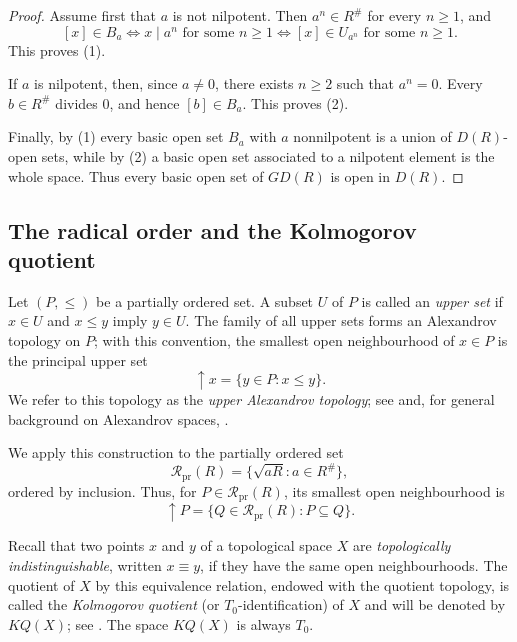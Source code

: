 \documentclass[11pt]{amsart}
\theoremstyle{plain}
\theoremstyle{definition}
\theoremstyle{remark}
\numberwithin{equation}{section}
\begin{document}
\begin{proof}
	Assume first that $a$ is not nilpotent. Then $a^n\in R^\#$ for every
	$n\geq1$, and
	\[
	[x]\in B_a
	\Longleftrightarrow
	x\mid a^n \text{ for some }n\geq1
	\Longleftrightarrow
	[x]\in U_{a^n}\text{ for some }n\geq1.
	\]
	This proves (1).
	
	If $a$ is nilpotent, then, since $a\neq 0$, there exists $n\geq 2$ such that $a^n=0$. Every
	$b\in R^\#$ divides $0$, and hence $[b]\in B_a$. This proves (2).
	
	Finally, by (1) every basic open set $B_a$ with $a$ nonnilpotent is a
	union of $D(R)$-open sets, while by (2) a basic open set associated to a
	nilpotent element is the whole space. Thus every basic open set of $GD(R)$
	is open in $D(R)$.
\end{proof}


\subsection{The radical order and the Kolmogorov quotient}

Let $(P,\leq)$ be a partially ordered set. A subset $U$ of $P$ is called
an \emph{upper set} if $x\in U$ and $x\leq y$ imply $y\in U$. The family
of all upper sets forms an Alexandrov topology on $P$; with this convention,
the smallest open neighbourhood of $x\in P$ is the principal upper set
\[
\uparrow x=\{y\in P:x\leq y\}.
\]
We refer to this topology as the \emph{upper Alexandrov topology};
see \cite{Curry} and, for general background on Alexandrov spaces,
\cite{Alex,Arenas}.

We apply this construction to the partially ordered set
\[
\mathcal R_{\mathrm{pr}}(R)
=
\{\sqrt{aR}:a\in R^\#\},
\]
ordered by inclusion. Thus, for $P\in\mathcal R_{\mathrm{pr}}(R)$, its
smallest open neighbourhood is
\[
\uparrow P
=
\{Q\in\mathcal R_{\mathrm{pr}}(R):P\subseteq Q\}.
\]

Recall that two points $x$ and $y$ of a topological space $X$ are
\emph{topologically indistinguishable}, written $x\equiv y$, if they have
the same open neighbourhoods. The quotient of $X$ by this equivalence
relation, endowed with the quotient topology, is called the
\emph{Kolmogorov quotient} (or $T_0$-identification) of $X$ and will be
denoted by $KQ(X)$; see \cite[Section 13C]{Willard}. The space $KQ(X)$
is always $T_0$.
\end{document}
